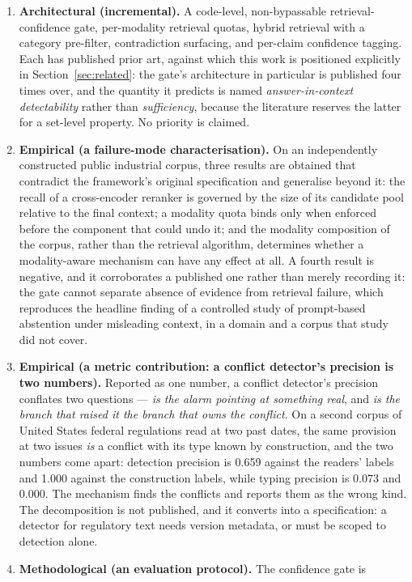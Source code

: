 \documentclass[preprint,3p,times]{elsarticle}
\begin{document}
\begin{enumerate}
\item \textbf{Architectural (incremental).} A code-level, non-bypassable
retrieval-confidence gate, per-modality retrieval quotas, hybrid retrieval with
a category pre-filter, contradiction surfacing, and per-claim confidence
tagging. Each has published prior art, against which this work is positioned
explicitly in Section~\ref{sec:related}: the gate's architecture in particular
is published four times over, and the quantity it predicts is named
\emph{answer-in-context detectability} rather than \emph{sufficiency}, because
the literature reserves the latter for a set-level property. No priority is
claimed.
\item \textbf{Empirical (a failure-mode characterisation).} On an independently
constructed public industrial corpus, three results are obtained that
contradict the framework's original specification and generalise beyond it: the
recall of a cross-encoder reranker is governed by the size of its candidate
pool relative to the final context; a modality quota binds only when enforced
before the component that could undo it; and the modality composition
of the corpus, rather than the retrieval algorithm, determines whether a
modality-aware mechanism can have any effect at all. A fourth result is
negative, and it corroborates a published one rather than merely recording it:
the gate cannot separate absence of evidence from retrieval failure, which
reproduces the headline finding of a controlled study of prompt-based
abstention under misleading context, in a domain and a corpus that study did
not cover.
\item \textbf{Empirical (a metric contribution: a conflict detector's precision
is two numbers).} Reported as one number, a conflict detector's precision
conflates two questions --- \emph{is the alarm pointing at something real},
and \emph{is the branch that raised it the branch that owns the conflict}.
On a second corpus of United States federal regulations read at two past
dates, the same provision at two issues \emph{is} a conflict with its type
known by construction, and the two numbers come apart: detection precision is
0.659 against the readers' labels and
1.000 against the construction labels, while
typing precision is 0.073 and 0.000.
The mechanism finds the conflicts and reports them as the wrong kind. The
decomposition is not published, and it converts into a specification: a
detector for regulatory text needs version metadata, or must be scoped to
detection alone.
\item \textbf{Methodological (an evaluation protocol).} The confidence gate is

\end{enumerate}
\end{document}
